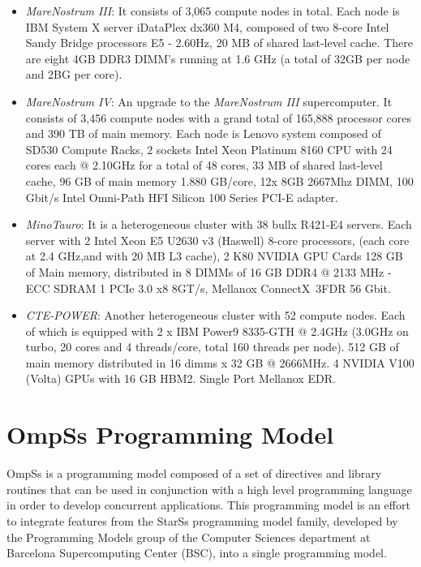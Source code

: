 \begin{itemize}
    \item \textit{MareNostrum III}: It consists of 3,065 compute nodes in total.  
        Each node is IBM System X server iDataPlex dx360 M4, composed of two 
        8-core Intel Sandy Bridge processors E5 - 2.60Hz, 20 MB of shared 
        last-level cache. There are eight 4GB DDR3 DIMM's running at 1.6 GHz (a 
        total of 32GB per node and 2BG per core).
    \item \textit{MareNostrum IV}: An upgrade to the \textit{MareNostrum III} 
        supercomputer. It consists of 3,456 compute nodes with a grand total of 
        165,888
        processor cores and 390 TB of main memory. Each node is Lenovo system 
        composed of SD530 Compute Racks, 2 sockets Intel Xeon Platinum 8160 CPU 
        with 24 cores each @ 2.10GHz for a total of 48 cores, 33 MB of shared 
        last-level cache, 96 GB of main memory 1.880 GB/core, 12x 8GB 2667Mhz 
        DIMM, 100 Gbit/s Intel Omni-Path HFI Silicon 100 Series PCI-E adapter.
    \item \textit{MinoTauro}: It is a heterogeneous cluster with 38 bullx 
        R421-E4 servers. Each server with 2 Intel Xeon E5 U2630 v3 (Haswell) 
        8-core processors, (each core at 2.4 GHz,and with 20 MB L3 cache), 2 K80 
        NVIDIA GPU Cards
        128 GB of Main memory, distributed in 8 DIMMs of 16 GB DDR4 @ 2133 MHz - 
        ECC SDRAM
        1 PCIe 3.0 x8 8GT/s, Mellanox ConnectX~\textregistered 3FDR 56 Gbit.
    \item \textit{CTE-POWER}: Another heterogeneous cluster with 52 compute 
        nodes. Each of which is equipped with 2 x IBM Power9 8335-GTH @ 2.4GHz 
        (3.0GHz on turbo, 20 cores and 4 threads/core, total 160 threads per 
        node).
        512 GB of main memory distributed in 16 dimms x 32 GB @ 2666MHz.  4 
        NVIDIA V100 (Volta) GPUs with 16 GB HBM2. Single Port Mellanox EDR.
\end{itemize}

\section{OmpSs Programming Model}
OmpSs is a programming model composed of a set of directives and library routines 
that can be used in conjunction with a high level programming language in order to 
develop concurrent applications. This programming model is an effort to integrate 
features from the StarSs programming model family, developed by the Programming 
Models group of the Computer Sciences department at Barcelona Supercomputing 
Center (BSC), into a single programming model.

